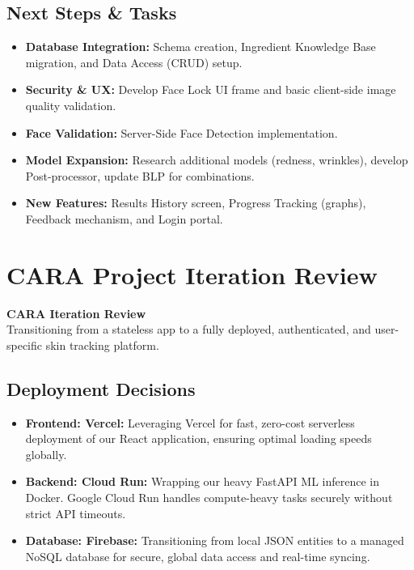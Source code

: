 \documentclass[12pt,a4paper]{article}
\begin{document}
\subsection{Next Steps \& Tasks}
\begin{itemize}
    \item \textbf{Database Integration:} Schema creation, Ingredient Knowledge Base migration, and Data Access (CRUD) setup.
    \item \textbf{Security \& UX:} Develop Face Lock UI frame and basic client-side image quality validation.
    \item \textbf{Face Validation:} Server-Side Face Detection implementation.
    \item \textbf{Model Expansion:} Research additional models (redness, wrinkles), develop Post-processor, update BLP for combinations.
    \item \textbf{New Features:} Results History screen, Progress Tracking (graphs), Feedback mechanism, and Login portal.
\end{itemize}

\newpage
\section{CARA Project Iteration Review}

\textbf{CARA Iteration Review}\\
Transitioning from a stateless app to a fully deployed, authenticated, and user-specific skin tracking platform.

\subsection{Deployment Decisions}
\begin{itemize}
    \item \textbf{Frontend: Vercel:} Leveraging Vercel for fast, zero-cost serverless deployment of our React application, ensuring optimal loading speeds globally.
    \item \textbf{Backend: Cloud Run:} Wrapping our heavy FastAPI ML inference in Docker. Google Cloud Run handles compute-heavy tasks securely without strict API timeouts.
    \item \textbf{Database: Firebase:} Transitioning from local JSON entities to a managed NoSQL database for secure, global data access and real-time syncing.
\end{itemize}
\end{document}
